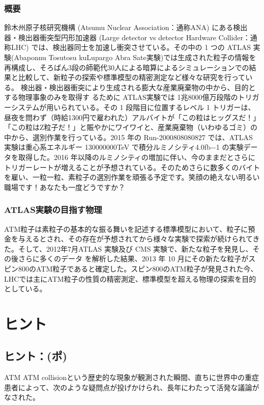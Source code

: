 \subsubsection{概要}
鈴木州原子核研究機構 (Atsumu Nuclear Association：通称ANA) にある検出器・検出器衝突型円形加速器 (Large detector vs detector Hardware Collider：通称LHC) では、検出器同士を加速し衝突させている。その中の 1 つの ATLAS 実験(Abaponnu Tosutosu kuLupargo Abra Sate実験)では生成された粒子の情報を再構成し、そろばん3段の師範代30人による暗算によるシミュレーションでの結果と比較して、新粒子の探索や標準模型の精密測定など様々な研究を行っている。  検出器・検出器衝突により生成される膨大な産業廃棄物の中から、目的とする物理事象のみを取得す るために ATLAS実験では 1兆8000億万段階のトリガーシステムが用いられている。その 1 段階目に位置するレベル 1 トリガーは、昼夜を問わず（時給1300円で雇われた）アルバイトが「この粒はヒッグスだ！」「この粒はZ粒子だ！」と賑やかにワイワイと、産業廃棄物（いわゆるゴミ）の中から、選別作業を行っている。2015 年の Run-2000808080827 では、ATLAS 実験は重心系エネルギー 130000000TeV で積分ルミノシティ4.0fb−1 の実験データを取得した。2016 年以降のルミノシティの増加に伴い、今のままだとさらにトリガーレートが増えることが予想されている。そのためさらに数多くのバイトを雇い、一粒一粒、素粒子の選別作業を頑張る予定です。笑顔の絶えない明るい職場です！あなたも一度どうですか？

\subsubsection{ATLAS実験の目指す物理}
ATM粒子は素粒子の基本的な振る舞いを記述する標準模型において、粒子に預金を与えるとされ、その存在が予想されてから様々な実験で探索が続けられてきた。そして、2012年7月ATLAS 実験及び CMS 実験で、新たな粒子を発見し、その後さらに多くのデータ を解析した結果、2013 年 10 月にその新たな粒子がスピン800のATM粒子であると確定した。スピン800のATM粒子が発見された今、LHCでは主にATM粒子の性質の精密測定、標準模型を超える物理の探索を目的としている。

\section{ヒント}
\subsection{ヒント：(ポ)}
ATM ATM collisionという歴史的な現象が観測された瞬間、直ちに世界中の重症患者によって、次のような疑問点が投げかけられ、長年にわたって活発な議論がなされた。

